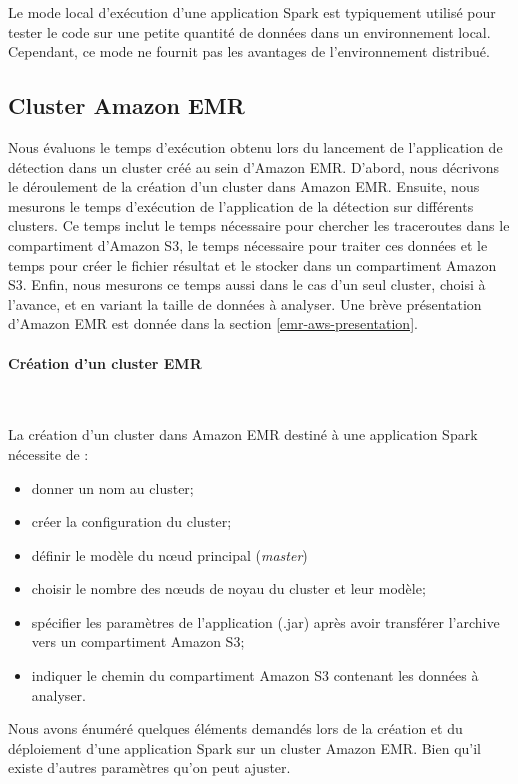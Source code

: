 Le mode local d'exécution d'une application Spark est typiquement utilisé pour tester le code sur une petite quantité de données dans un environnement local. Cependant, ce mode  ne fournit pas les avantages de l'environnement distribué. 

\subsection{Cluster Amazon EMR}

Nous évaluons le temps d'exécution obtenu lors du lancement de l'application de détection dans un cluster créé au sein d'Amazon EMR. D'abord, nous  décrivons le déroulement de la création d'un cluster dans Amazon EMR. Ensuite, nous mesurons le temps d'exécution de l'application de la détection sur différents clusters. Ce temps inclut le temps nécessaire  pour chercher les traceroutes dans le compartiment d'Amazon S3, le temps nécessaire pour traiter ces données et  le temps pour créer le fichier résultat et le stocker dans un compartiment Amazon S3. Enfin, nous mesurons ce temps  aussi dans le cas d'un seul cluster, choisi à l'avance, et en variant la taille  de données à analyser. Une brève présentation d'Amazon EMR est donnée dans la section \ref{emr-aws-presentation}.

\paragraph{Création d'un cluster EMR}~

La création d'un cluster dans Amazon EMR destiné à une application Spark nécessite de  :
\begin{itemize}
	\item donner un nom au cluster;
	\item créer la configuration du cluster;
	\item définir le modèle du n\oe{}ud principal (\textit{master}) 
	\item choisir le nombre des n\oe{}uds de noyau  du cluster et leur modèle;
	\item spécifier les paramètres de l'application  (.jar) après avoir transférer l'archive vers  un compartiment Amazon S3;
	\item indiquer le chemin du compartiment Amazon S3 contenant  les données à analyser.
\end{itemize}

Nous avons énuméré quelques éléments demandés lors de la création et du déploiement d'une application Spark sur un cluster Amazon EMR. Bien  qu'il existe d'autres paramètres qu'on peut ajuster. 

